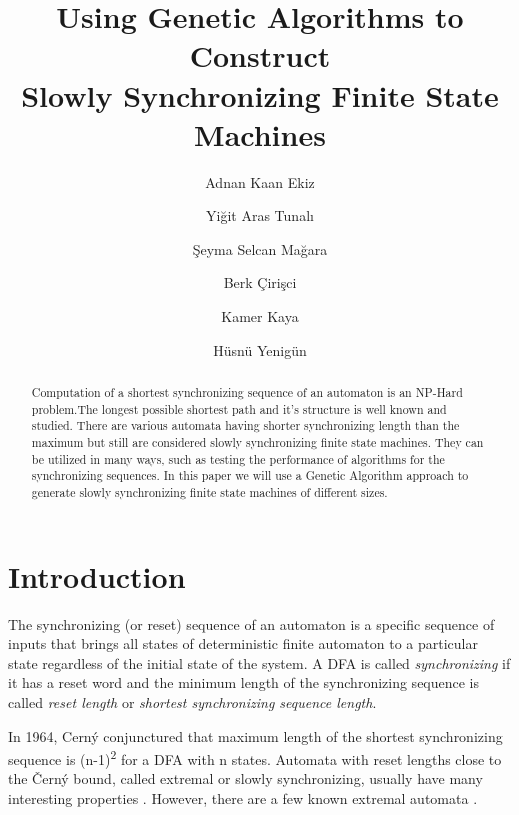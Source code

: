 \documentclass[runningheads]{llncs}
\begin{document}
\title{Using Genetic Algorithms to Construct\\ Slowly Synchronizing Finite State Machines}

\author{Adnan Kaan Ekiz  \and Yi\u{g}it Aras Tunal{\i} \and
\c{S}eyma Selcan Ma\u{g}ara \and Berk \c{C}iri\c{s}ci \and Kamer Kaya \and H\"{u}sn\"{u} Yenig\"{u}n}


\maketitle

\begin{abstract}
Computation of a shortest synchronizing sequence of an automaton is an NP-Hard problem.The longest possible shortest path and it's structure is well known and studied. There are various automata having shorter synchronizing length than the maximum but still are considered slowly synchronizing finite state machines. They can be utilized in many ways, such as testing the performance of algorithms for the synchronizing sequences. In this paper we will use a Genetic Algorithm approach to generate slowly synchronizing finite state machines of different sizes.
\end{abstract}

\section{Introduction}
The synchronizing (or reset) sequence of an automaton is a specific sequence of inputs that brings all states of deterministic finite automaton to a particular state regardless of the initial state of the system. A DFA is called \textit{synchronizing} if it has a reset word and the minimum length of the synchronizing sequence is called \textit{reset length} or \textit{shortest synchronizing sequence length}.\par
In 1964, Cerný \cite{cerny} conjunctured that maximum length of the shortest synchronizing sequence is (n-1)\textsuperscript{2} for a DFA with n states. Automata with reset lengths close to the Černý bound, called extremal or slowly synchronizing, usually have many interesting properties \cite{podolak_roman_szykula_zielinski_2017}. However, there are a few known extremal automata  \cite{Ananichev_Gusev_Volkov_2010}.
\end{document}
